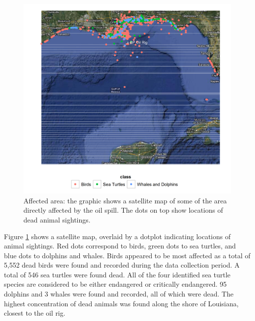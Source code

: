 \documentclass[11pt]{article}
\begin{document}
\begin{figure}[htbp] %
   \centering
   \includegraphics[width=5in]{animal_deaths.png} 
   \caption{Affected area: the graphic shows a satellite map of some of the area directly affected by the oil spill. The dots on top show locations of dead animal sightings. }
   \label{deaths}
\end{figure}
Figure \ref{deaths} shows a satellite map, overlaid by a dotplot indicating locations of animal sightings. Red dots correspond to birds, green dots to sea turtles, and blue dots to dolphins and whales.  Birds appeared to be most affected as a total of 5,552 dead birds were found and recorded during the data collection period.  A total of 546 sea turtles were found dead.  All of the four identified sea turtle species are considered to be either endangered or critically endangered. 95 dolphins and 3 whales were found and recorded, all of which were dead. The highest concentration of dead animals was found along the shore of Louisiana, closest to the oil rig.  
\end{document}
